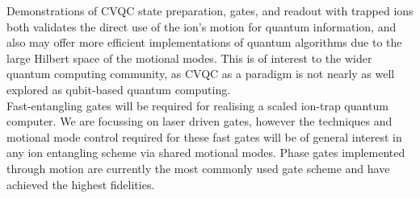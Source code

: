 \documentclass[12pt]{article}
\begin{document}
\noindent Demonstrations of CVQC state preparation, gates, and readout with trapped ions both validates the direct use of the ion's motion for quantum information, and also may offer more efficient implementations of quantum algorithms due to the large Hilbert space of the motional modes. This is of interest to the wider quantum computing community, as CVQC as a paradigm is not nearly as well explored as qubit-based quantum computing.\\

\noindent Fast-entangling gates will be required for realising a scaled ion-trap quantum computer. We are focussing on laser driven gates, however the techniques and motional mode control required for these fast gates will be of general interest in any ion entangling scheme via shared motional modes. 
Phase gates implemented through motion are currently the most commonly used gate scheme and have achieved the highest fidelities.\\
\end{document}
